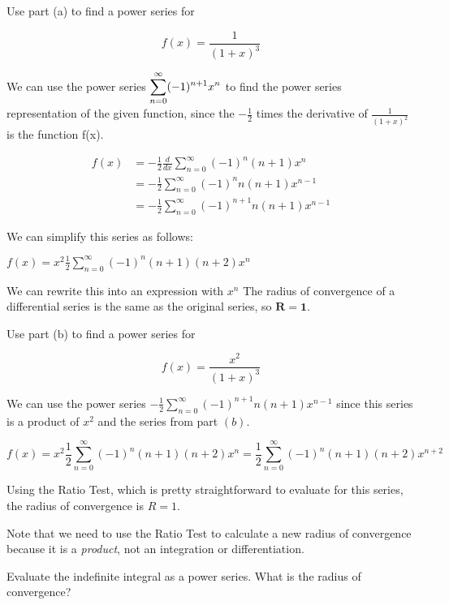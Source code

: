 \documentclass[12pt]{article}
\begin{document}
\begin{solution}
Use part (a) to find a power series for 

$$f(x) = \frac{1}{(1 + x)^{3}} $$

We can use the power series $\mathlarger{\sum^{\infty}_{n = 0} (-1)^{n + 1}x^{n}}$ to find the power series representation of the given function, since the $-\frac{1}{2}$ times the derivative of $\frac{1}{(1 + x)^2}$ is the  function f(x).

\begin{align*}
f(x) &= -\frac{1}{2} \frac{d}{dx} \sum_{n = 0}^{\infty} (-1)^{n} (n + 1)x^{n} \\
	&= -\frac{1}{2} \sum_{n = 0}^{\infty}  (-1)^{n}n(n + 1)x^{n -1} \\
	&= -\frac{1}{2} \sum_{n = 0}^{\infty} (-1)^{n+1}n(n + 1)x^{n - 1}
\end{align*}

We can simplify this series as follows:

$f(x) = x^{2} \frac{1}{2} \sum_{n = 0}^{\infty} (-1)^{n}(n + 1)(n + 2)x^{n}$

We can rewrite this into an expression with $x^{n}$ 
The radius of convergence of a differential series is the same as the original series, so $\mathbf{R = 1}$.

\end{solution}

\begin{solution}
Use part (b) to find a power series for 

$$f(x) = \frac{x^{2}}{(1 + x)^{3}} $$

We can use the power series $-\frac{1}{2} \sum_{n = 0}^{\infty} (-1)^{n+1}n(n + 1)x^{n - 1}$  since this series is a product of $x^2$ and the series from part $(b)$.

$$f(x) = x^{2} \frac{1}{2} \sum_{n = 0}^{\infty} (-1)^{n}(n + 1)(n + 2)x^{n} = \frac{1}{2} \sum_{n = 0}^{\infty} (-1)^{n}(n + 1)(n + 2)x^{n + 2} $$

Using the Ratio Test, which is pretty straightforward to evaluate for this series, the radius of convergence is $R = 1$.

Note that we need to use the Ratio Test to calculate a new radius of convergence because it is a \emph{product}, not an integration or differentiation.

\end{solution}
\pagebreak
Evaluate the indefinite integral as a power series. What is the radius of convergence?
\end{document}
